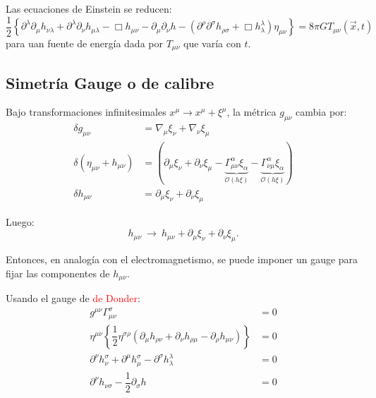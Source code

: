 \documentclass[../main]{subfiles}
\begin{document}
Las ecuaciones de Einstein se reducen:
\begin{equation}
    \dfrac{1}{2}\left\{\partial^{\lambda}\partial_{\mu}h_{\nu\lambda}+\partial^{\lambda}\partial_{\nu}h_{\mu\lambda}-\Box h_{\mu\nu}-\partial_{\mu}\partial_{\nu}h-(\partial^{\rho}\partial^{\sigma}h_{\rho\sigma}+\Box h^{\lambda}_{\lambda})\eta_{\mu\nu}\right\}=8\pi G T_{\mu\nu}(\vec{x}, t)
\end{equation}
para uan fuente de energía dada por $T_{\mu\nu}$ que varía con $t$.

\subsection{Simetría Gauge o de calibre}

Bajo transformaciones infinitesimales $x^{\mu} \rightarrow x^{\mu}+\xi^{\mu}$, la métrica $g_{\mu\nu}$ cambia por:
\begin{equation}
    \begin{split}
        \delta g_{\mu\nu}&=\nabla_{\mu} \xi_{\nu}+\nabla_{\nu}\xi_{\mu} \\
        \delta(\eta_{\mu\nu}+h_{\mu\nu})&=(\partial_{\mu}\xi_{\nu}+\partial_{\nu}\xi_{\mu}-\underbrace{\Gamma^{\alpha}_{\mu\nu}\xi_{\alpha}}_{\mathcal{O}(h\xi)}-\underbrace{\Gamma^{\alpha}_{\nu\mu}\xi_{\alpha}}_{\mathcal{O}(h\xi)}) \\
        \delta h_{\mu\nu}&=\partial_{\mu} \xi_{\nu}+\partial_{\nu} \xi_{\mu}
    \end{split}
\end{equation}

Luego:
\begin{equation}
    h_{\mu\nu} \ \rightarrow \ h_{\mu\nu}+\partial_{\mu}\xi_{\nu}+\partial_{\nu}\xi_{\mu}.
\end{equation}

Entonces, en analogía con el electromagnetismo, se puede imponer un gauge para fijar las componentes de $h_{\mu\nu}$. 

Usando el gauge de \textcolor{red}{de Donder}:
\begin{equation}
    \begin{split}
        g^{\mu\nu}\Gamma^{\sigma}_{\mu\nu}&=0\\
        \eta^{\mu\nu}\left\{\dfrac{1}{2}\eta^{\sigma\rho}(\partial_{\mu}h_{\rho\nu}+\partial_{\nu}h_{\rho\mu}-\partial_{\rho}h_{\mu\nu})\right\}&=0\\
        \partial^{\nu}h^{\sigma}_{\nu}+\partial^{\mu}h^{\sigma}_{\mu}-\partial^{\sigma}h^{\lambda}_{\lambda}&=0\\
        \partial^{\nu}h_{\nu\sigma}-\dfrac{1}{2}\partial_{\sigma}h&=0
    \end{split}
\end{equation}
\end{document}

